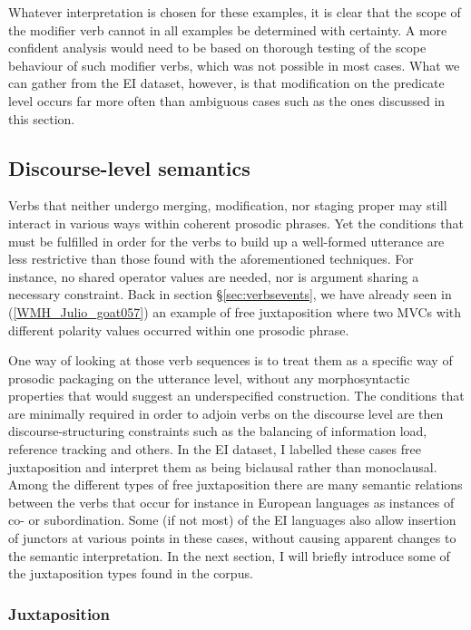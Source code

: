 Whatever interpretation is chosen for these examples, it is clear that the scope of the modifier verb cannot in all examples be determined with certainty. A more confident analysis would need to be based on thorough testing of the scope behaviour of such modifier verbs, which was not possible in most cases. What we can gather from the EI dataset, however, is that modification on the predicate level occurs far more often than ambiguous cases such as the ones discussed in this section.

\subsection{Discourse-level semantics} \label{sec:discourse-level}

Verbs that neither undergo merging, modification, nor staging proper may still interact in various ways within coherent prosodic phrases. Yet the conditions that must be fulfilled in order for the verbs to build up a well-formed utterance are less restrictive than those found with the aforementioned techniques. For instance, no shared operator values are needed, nor is argument sharing a necessary constraint. Back in section §\ref{sec:verbsevents}, we have already seen in (\ref{WMH_Julio_goat057}) an example of free juxtaposition where two MVCs with different polarity values occurred within one prosodic phrase. 

One way of looking at those verb sequences is to treat them as a specific way of prosodic packaging on the utterance level, without any morphosyntactic properties that would suggest an underspecified construction. The conditions that are minimally required in order to adjoin verbs on the discourse level are then discourse-structuring constraints such as the balancing of information load, reference tracking and others. In the EI dataset, I labelled these cases free juxtaposition and interpret them as being biclausal rather than monoclausal. Among the different types of free juxtaposition there are many semantic relations between the verbs that occur for instance in European languages as instances of co- or subordination. Some (if not most) of the EI languages also allow insertion of junctors at various points in these cases, without causing apparent changes to the semantic interpretation. In the next section, I will briefly introduce some of the juxtaposition types found in the corpus.

\subsubsection{Juxtaposition}
\label{sec:juxtaposition}

